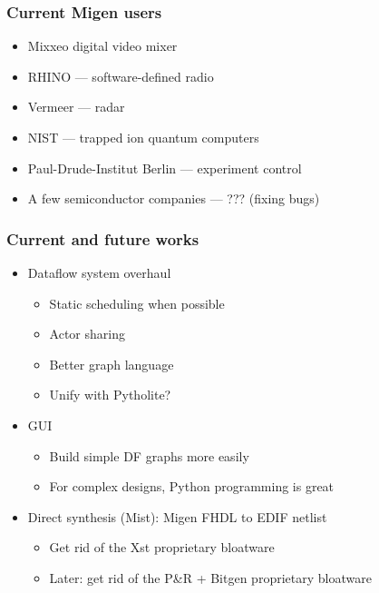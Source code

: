 \documentclass{beamer}
\begin{document}
\begin{frame}
\frametitle{Current Migen users}
\begin{itemize}
\item Mixxeo digital video mixer
\item RHINO --- software-defined radio
\item Vermeer --- radar
\item NIST --- trapped ion quantum computers
\item Paul-Drude-Institut Berlin --- experiment control
\item A few semiconductor companies --- ??? (fixing bugs)
\end{itemize}
\end{frame}

\begin{frame}
\frametitle{Current and future works}
\begin{itemize}
\item Dataflow system overhaul
\begin{itemize}
\item Static scheduling when possible
\item Actor sharing
\item Better graph language
\item Unify with Pytholite?
\end{itemize}
\item GUI
\begin{itemize}
\item Build simple DF graphs more easily
\item For complex designs, Python programming is great
\end{itemize}
\item Direct synthesis (Mist): Migen FHDL to EDIF netlist
\begin{itemize}
\item Get rid of the Xst proprietary bloatware
\item Later: get rid of the P\&R + Bitgen proprietary bloatware
\end{itemize}
\end{itemize}
\end{frame}
\end{document}
